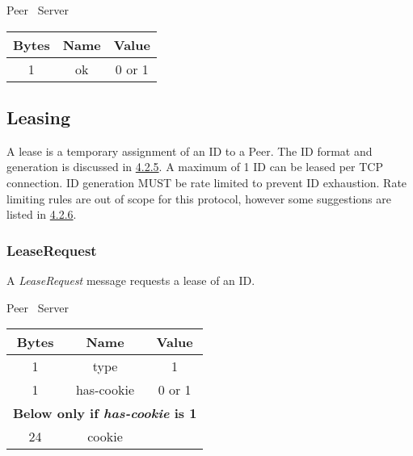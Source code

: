 \documentclass{article}
\begin{document}
    \begin{center}
        Peer \textrightarrow\ Server\\
        \begin{tabular}{|c|c|c|}
            \hline
            \textbf{Bytes} & \textbf{Name} & \textbf{Value} \\
            \hline
            1              & ok            & 0 or 1         \\
            \hline
        \end{tabular}
    \end{center}

    \subsection{Leasing}

    A lease is a temporary assignment of an ID to a Peer. The ID format and generation is discussed in
    \hyperlink{subsubsection.4.2.5}{4.2.5}. A maximum of 1 ID can be leased per TCP connection. ID generation MUST be
    rate limited to prevent ID exhaustion. Rate limiting rules are out of scope for this protocol, however some
    suggestions are listed in \hyperlink{subsubsection.4.2.6}{4.2.6}.

    \subsubsection{LeaseRequest}

    A \emph{LeaseRequest} message requests a lease of an ID.

    \begin{center}
        Peer \textrightarrow\ Server\\
        \begin{tabular}{|c|c|c|}
            \hline
            \textbf{Bytes} & \textbf{Name} & \textbf{Value} \\
            \hline
            1              & type          & 1              \\
            \hline
            1              & has-cookie    & 0 or 1         \\
            \hline
            \multicolumn{3}{|c|}{\textbf{Below only if \emph{has-cookie} is 1} } \\
            \hline
            24             & cookie        &                \\
            \hline
        \end{tabular}
    \end{center}
\end{document}
